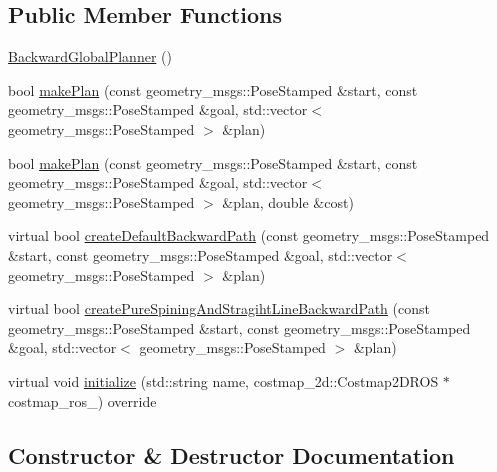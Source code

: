 \subsection*{Public Member Functions}
\begin{DoxyCompactItemize}
\item 
\hyperlink{classbackward__global__planner_1_1BackwardGlobalPlanner_a48d3b3dce0048508b0cbaf399102803f}{Backward\+Global\+Planner} ()
\item 
bool \hyperlink{classbackward__global__planner_1_1BackwardGlobalPlanner_a39f2e0d5090f0776942d7cd68eecbde1}{make\+Plan} (const geometry\+\_\+msgs\+::\+Pose\+Stamped \&start, const geometry\+\_\+msgs\+::\+Pose\+Stamped \&goal, std\+::vector$<$ geometry\+\_\+msgs\+::\+Pose\+Stamped $>$ \&plan)
\item 
bool \hyperlink{classbackward__global__planner_1_1BackwardGlobalPlanner_ade177af3c2a0660781f71e3c2ba0b343}{make\+Plan} (const geometry\+\_\+msgs\+::\+Pose\+Stamped \&start, const geometry\+\_\+msgs\+::\+Pose\+Stamped \&goal, std\+::vector$<$ geometry\+\_\+msgs\+::\+Pose\+Stamped $>$ \&plan, double \&cost)
\item 
virtual bool \hyperlink{classbackward__global__planner_1_1BackwardGlobalPlanner_a625dba5902c088241ab25c9fb628fd04}{create\+Default\+Backward\+Path} (const geometry\+\_\+msgs\+::\+Pose\+Stamped \&start, const geometry\+\_\+msgs\+::\+Pose\+Stamped \&goal, std\+::vector$<$ geometry\+\_\+msgs\+::\+Pose\+Stamped $>$ \&plan)
\item 
virtual bool \hyperlink{classbackward__global__planner_1_1BackwardGlobalPlanner_ad0caebe12fdd6cfe66d353bc7b772718}{create\+Pure\+Spining\+And\+Stragiht\+Line\+Backward\+Path} (const geometry\+\_\+msgs\+::\+Pose\+Stamped \&start, const geometry\+\_\+msgs\+::\+Pose\+Stamped \&goal, std\+::vector$<$ geometry\+\_\+msgs\+::\+Pose\+Stamped $>$ \&plan)
\item 
virtual void \hyperlink{classbackward__global__planner_1_1BackwardGlobalPlanner_ac0dfce1f9ba6d39a3b37ea6c99fac2ae}{initialize} (std\+::string name, costmap\+\_\+2d\+::\+Costmap2\+D\+R\+OS $\ast$costmap\+\_\+ros\+\_\+) override
\end{DoxyCompactItemize}


\subsection{Constructor \& Destructor Documentation}
\mbox{\label{classbackward__global__planner_1_1BackwardGlobalPlanner_a48d3b3dce0048508b0cbaf399102803f}} 
